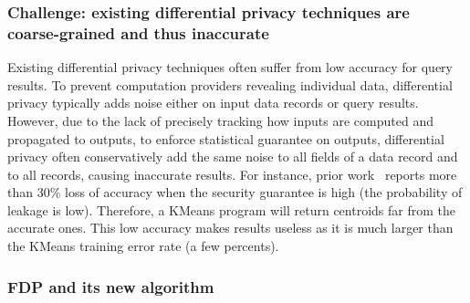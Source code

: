 \vspace{-.15in}
\subsubsection{Challenge: existing differential privacy techniques are 
coarse-grained and thus inaccurate} 
\label{sec:ift-problem}\vspace{-.075in}

Existing differential privacy techniques often suffer from low accuracy for 
query results. To prevent computation providers revealing individual 
data, differential privacy typically adds noise either on input data 
records or query results. However, due to the lack of precisely tracking 
how inputs are computed and propagated to outputs, to enforce statistical 
guarantee on outputs, differential privacy often conservatively add the same 
noise to all fields of a data record and to all records, causing inaccurate 
results. For instance, prior work~\cite{differentialresult:vldb15} reports 
more than 30\% loss of accuracy when the security guarantee is high (the 
probability of leakage is low). Therefore, a KMeans program will return 
centroids far from the accurate ones. This low accuracy makes results useless as 
it is much larger than the KMeans training error rate (a few percents).

\vspace{-.15in}
\subsubsection{FDP and its new algorithm} 
\label{sec:ift-problem}\vspace{-.075in}

